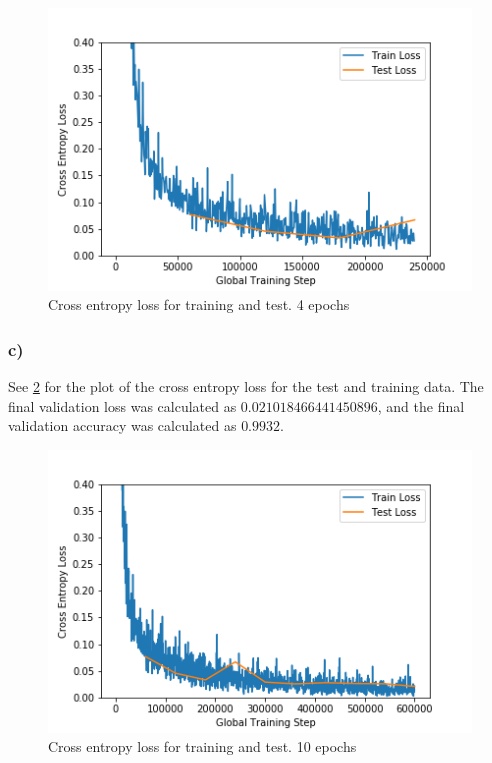 \begin{figure}[]
    \centering
    \includegraphics[width=1.00\textwidth]{figures/image_processed/task2_b.png}
    \caption{Cross entropy loss for training and test. 4 epochs}
    \label{fig:task2b}
\end{figure}


\subsubsection*{c)}
See \cref{fig:task2c} for the plot of the cross entropy loss for the test and training data. The final validation loss was calculated as $0.021018466441450896$, and the final validation accuracy was calculated as $0.9932$. 

\begin{figure}[]
    \centering
    \includegraphics[width=1.00\textwidth]{figures/image_processed/task2_c.png}
    \caption{Cross entropy loss for training and test. 10 epochs}
    \label{fig:task2c}
\end{figure}

